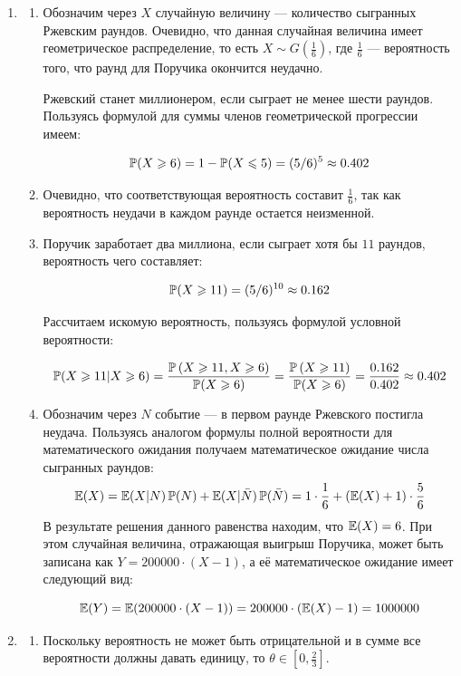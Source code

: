 \begin{enumerate}
	\item 
	\begin{enumerate}
		\item Обозначим через $X$ случайную величину — количество сыгранных Ржевским раундов. Очевидно, что данная случайная величина имеет геометрическое распределение, то есть $X\sim G(\frac{1}{6})$, где $\frac{1}{6}$ — вероятность того, что раунд для Поручика окончится неудачно.
		
		Ржевский станет миллионером, если сыграет не менее шести раундов. Пользуясь формулой для суммы членов геометрической прогрессии имеем:
		
		\[
		\P(X\geq 6)=1-\P(X\leq 5)=(5/6)^5 \approx 0.402
		\]
		
		\item Очевидно, что соответствующая вероятность составит $\frac{1}{6}$, так как вероятность неудачи в каждом раунде остается неизменной.
	
		
		\item
		Поручик заработает два миллиона, если сыграет хотя бы $11$ раундов, вероятность чего составляет:
		
		\[
		\P(X\geq 11)=(5/6)^{10} \approx0.162
		\]
		
		Рассчитаем искомую вероятность, пользуясь формулой условной вероятности:
		
		\[
		\P(X\geq 11|X\geq 6)=\frac{\P\left(X\geq 11, X\geq 6\right)}{\P(X\geq 6)}=\frac{\P\left(X\geq 11\right)}{\P(X\geq 6)}=\frac{0.162}{0.402}\approx 0.402
		\]
		
			
		\item Обозначим через $N$ событие — в первом раунде Ржевского постигла неудача. Пользуясь аналогом формулы полной вероятности для математического ожидания получаем математическое ожидание числа сыгранных раундов:
		\[
		\E(X)=\E(X|N)\P(N)+\E(X|\bar{N})\P(\bar{N})=1\cdot \frac{1}{6}+(\E(X)+1)\cdot \frac{5}{6}
		\]
	В результате решения данного равенства находим, что $\E(X)=6$. При этом случайная величина, отражающая выигрыш Поручика, может быть записана как $Y=200000\cdot (X-1)$, а её математическое ожидание имеет следующий вид:
	
	\[
	\E(Y)=\E(200000\cdot (X-1))=200000\cdot (\E(X)-1)=1000000
	\]
	
	
	\end{enumerate}
	
	
	\item 
	\begin{enumerate}
		\item Поскольку вероятность не может быть отрицательной и в сумме все вероятности должны давать единицу, то $\theta\in[0,\frac{2}{3}]$.
		

\end{enumerate}
\end{enumerate}
